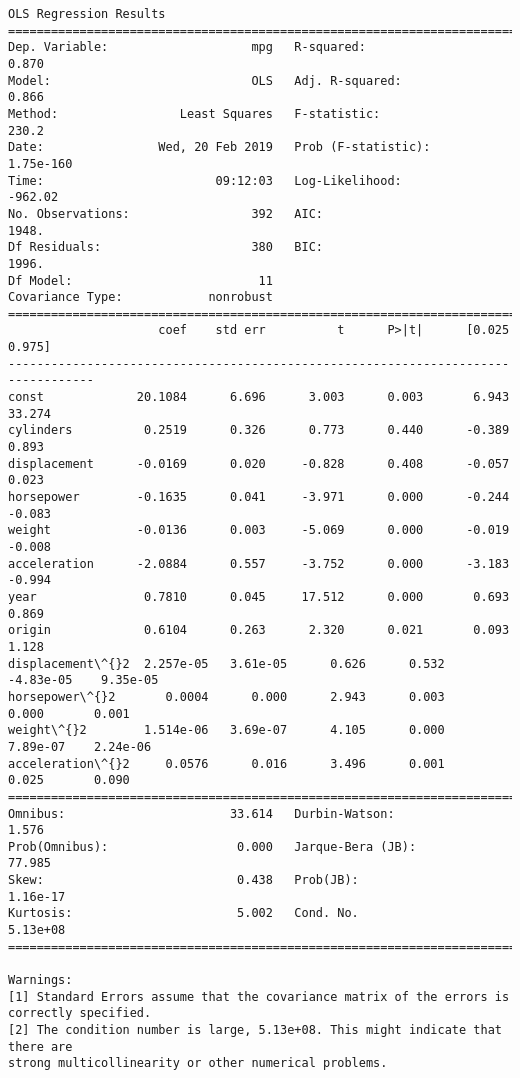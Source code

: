 \documentclass[11pt]{article}
\begin{document}
    \begin{Verbatim}[commandchars=\\\{\}]
                            OLS Regression Results                            
==============================================================================
Dep. Variable:                    mpg   R-squared:                       0.870
Model:                            OLS   Adj. R-squared:                  0.866
Method:                 Least Squares   F-statistic:                     230.2
Date:                Wed, 20 Feb 2019   Prob (F-statistic):          1.75e-160
Time:                        09:12:03   Log-Likelihood:                -962.02
No. Observations:                 392   AIC:                             1948.
Df Residuals:                     380   BIC:                             1996.
Df Model:                          11                                         
Covariance Type:            nonrobust                                         
==================================================================================
                     coef    std err          t      P>|t|      [0.025      0.975]
----------------------------------------------------------------------------------
const             20.1084      6.696      3.003      0.003       6.943      33.274
cylinders          0.2519      0.326      0.773      0.440      -0.389       0.893
displacement      -0.0169      0.020     -0.828      0.408      -0.057       0.023
horsepower        -0.1635      0.041     -3.971      0.000      -0.244      -0.083
weight            -0.0136      0.003     -5.069      0.000      -0.019      -0.008
acceleration      -2.0884      0.557     -3.752      0.000      -3.183      -0.994
year               0.7810      0.045     17.512      0.000       0.693       0.869
origin             0.6104      0.263      2.320      0.021       0.093       1.128
displacement\^{}2  2.257e-05   3.61e-05      0.626      0.532   -4.83e-05    9.35e-05
horsepower\^{}2       0.0004      0.000      2.943      0.003       0.000       0.001
weight\^{}2        1.514e-06   3.69e-07      4.105      0.000    7.89e-07    2.24e-06
acceleration\^{}2     0.0576      0.016      3.496      0.001       0.025       0.090
==============================================================================
Omnibus:                       33.614   Durbin-Watson:                   1.576
Prob(Omnibus):                  0.000   Jarque-Bera (JB):               77.985
Skew:                           0.438   Prob(JB):                     1.16e-17
Kurtosis:                       5.002   Cond. No.                     5.13e+08
==============================================================================

Warnings:
[1] Standard Errors assume that the covariance matrix of the errors is correctly specified.
[2] The condition number is large, 5.13e+08. This might indicate that there are
strong multicollinearity or other numerical problems.

    \end{Verbatim}
\end{document}
